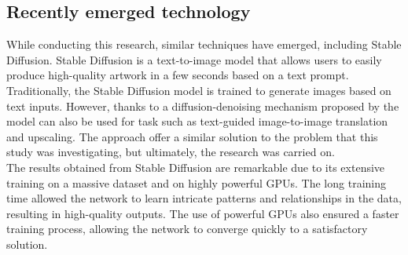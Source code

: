 \subsection{Recently emerged technology}
While conducting this research, similar techniques have emerged, including Stable Diffusion. Stable Diffusion is a text-to-image model that allows users to easily produce high-quality artwork in a few seconds based on a text prompt. Traditionally, the Stable Diffusion model is trained to generate images based on text inputs. However, thanks to a diffusion-denoising mechanism proposed by \cite{SDEedit} the model can also be used for task such as text-guided image-to-image translation and upscaling.
The approach offer a similar solution to the problem that this study was investigating, but ultimately, the research was carried on. \\
The results obtained from Stable Diffusion are remarkable due to its extensive training on a massive dataset and on highly powerful GPUs. The long training time allowed the network to learn intricate patterns and relationships in the data, resulting in high-quality outputs. The use of powerful GPUs also ensured a faster training process, allowing the network to converge quickly to a satisfactory solution.

